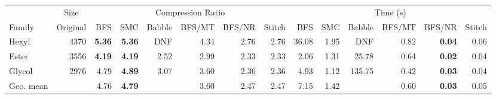\begin{tabular}{l r rrrrrr rrrrrr}
\toprule
& \multicolumn{1}{c}{Size} & \multicolumn{6}{c}{Compression Ratio} & \multicolumn{6}{c}{Time (s)} \\
\cmidrule(lr){2-2} \cmidrule(lr){3-8} \cmidrule(lr){9-14}
Family & Original & BFS & SMC & Babble & BFS/MT & BFS/NR & Stitch & BFS & SMC & Babble & BFS/MT & BFS/NR & Stitch \\
\midrule
Hexyl & 4370 & \textbf{5.36} & \textbf{5.36} & DNF & 4.34 & 2.76 & 2.76 & 36.08 & 1.95 & DNF & 0.82 & \textbf{0.04} & 0.06 \\
Ester & 3556 & \textbf{4.19} & \textbf{4.19} & 2.52 & 2.99 & 2.33 & 2.33 & 2.06 & 1.31 & 25.78 & 0.64 & \textbf{0.02} & 0.04 \\
Glycol & 2976 & 4.79 & \textbf{4.89} & 3.07 & 3.60 & 2.36 & 2.36 & 4.93 & 1.12 & 135.75 & 0.42 & \textbf{0.03} & 0.04 \\
\midrule
Geo. mean &  & 4.76 & \textbf{4.79} &  & 3.60 & 2.47 & 2.47 & 7.15 & 1.42 &  & 0.60 & \textbf{0.03} & 0.05 \\
\bottomrule
\end{tabular}
